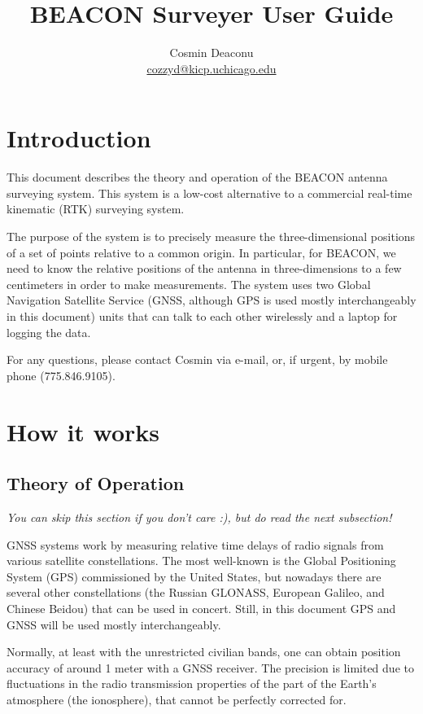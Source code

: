 \documentclass[usletter]{article}
\title{BEACON Surveyer User Guide}
\author{Cosmin Deaconu
\\ \href{mailto:cozzyd@kicp.uchicago.edu}{cozzyd@kicp.uchicago.edu} 
}
\begin{document}
 

\maketitle

\tableofcontents

\section{Introduction} 

This document describes the theory and operation of the BEACON antenna surveying system.
This system is a low-cost alternative to a commercial real-time kinematic (RTK)
surveying system.  

The purpose of the system is to precisely measure the three-dimensional
positions  of a set of points relative to a common origin. In particular, for
BEACON, we need to know the relative positions of the antenna in
three-dimensions to a few centimeters in order to make measurements.  The
system uses two Global Navigation Satellite Service (GNSS, although GPS is used mostly interchangeably in this document) units that can talk to each other wirelessly and a laptop
for logging the data. 

For any questions, please contact Cosmin via e-mail, or, if urgent, by mobile phone (775.846.9105).


\section{How it works} 


\subsection{Theory of Operation} 

\textit{You can skip this section if you don't care :), but do read the next subsection!} 

GNSS systems work by measuring relative time delays of radio signals from
various satellite constellations. The most well-known is the Global Positioning
System (GPS) commissioned by the United States, but nowadays there are several
other constellations (the Russian GLONASS, European Galileo, and Chinese
Beidou) that can be used in concert. Still, in this document GPS and GNSS will 
be used mostly interchangeably.

Normally, at least with the unrestricted civilian bands, one can obtain
position accuracy of around 1 meter with a GNSS receiver. The precision is limited
due to fluctuations in the radio transmission properties of the part of the
Earth's atmosphere (the ionosphere), that cannot be perfectly corrected for. 
\end{document}
